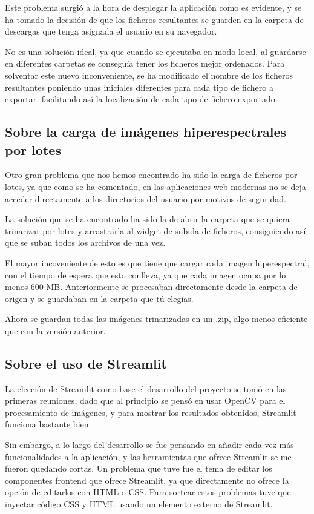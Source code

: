 Este problema surgió a la hora de desplegar la aplicación como es evidente, y se ha tomado la decisión de que los ficheros resultantes se guarden en la carpeta de descargas que tenga asignada el usuario en su navegador.

No es una solución ideal, ya que cuando se ejecutaba en modo local, al guardarse en diferentes carpetas se conseguía tener los ficheros mejor ordenados. Para solventar este nuevo inconveniente, se ha modificado el nombre de los ficheros resultantes poniendo unas iniciales diferentes para cada tipo de fichero a exportar, facilitando así la localización de cada tipo de fichero exportado.

\subsection{Sobre la carga de imágenes hiperespectrales por lotes}
Otro gran problema que nos hemos encontrado ha sido la carga de ficheros por lotes, ya que como se ha comentado, en las aplicaciones web modernas no se deja acceder directamente a los directorios del usuario por motivos de seguridad.

La solución que se ha encontrado ha sido la de abrir la carpeta que se quiera trinarizar por lotes y arrastrarla al widget de subida de ficheros, consiguiendo así que se suban todos los archivos de una vez.

El mayor incoveniente de esto es que tiene que cargar cada imagen hiperespectral, con el tiempo de espera que esto conlleva, ya que cada imagen ocupa por lo menos 600 MB. Anteriormente se procesaban directamente desde la carpeta de origen y se guardaban en la carpeta que tú elegías.

Ahora se guardan todas las imágenes trinarizadas en un .zip, algo menos eficiente que con la versión anterior.

\subsection{Sobre el uso de Streamlit}
La elección de Streamlit como base el desarrollo del proyecto se tomó en las primeras reuniones, dado que al principio se pensó en usar OpenCV para el procesamiento de imágenes, y para mostrar los resultados obtenidos, Streamlit funciona bastante bien. 

Sin embargo, a lo largo del desarrollo se fue pensando en añadir cada vez más funcionalidades a la aplicación, y las herramientas que ofrece Streamlit se me fueron quedando cortas. Un problema que tuve fue el tema de editar los componentes frontend que ofrece Streamlit, ya que directamente no ofrece la opción de editarlos con HTML o CSS. 
Para sortear estos problemas tuve que inyectar código CSS y HTML usando un elemento externo de Streamlit.

